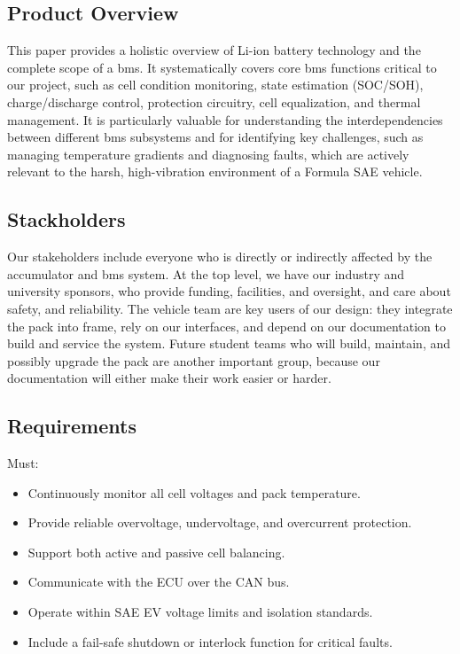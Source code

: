 \subsection{Product Overview}
This paper provides a holistic overview of Li-ion battery technology and the complete scope of a \gls{bms}. It systematically covers core \gls{bms} functions critical to our project, such as cell condition monitoring, state estimation (SOC/SOH), charge/discharge control, protection circuitry, cell equalization, and thermal management. It is particularly valuable for understanding the interdependencies between different \gls{bms} subsystems and for identifying key challenges, such as managing temperature gradients and diagnosing faults, which are actively relevant to the harsh, high-vibration environment of a Formula SAE vehicle.

\subsection{Stackholders}
Our stakeholders include everyone who is directly or indirectly affected by the accumulator and \gls{bms} system. At the top level, we have our industry and university sponsors, who provide funding, facilities, and oversight, and care about safety, and reliability. The vehicle team are key users of our design: they integrate the pack into frame, rely on our interfaces, and depend on our documentation to build and service the system. Future student teams who will build, maintain, and possibly upgrade the pack are another important group, because our documentation will either make their work easier or harder.

\subsection{Requirements}

Must:
\begin{itemize}
	\item Continuously monitor all cell voltages and pack temperature.
	\item Provide reliable overvoltage, undervoltage, and overcurrent protection.
	\item Support both active and passive cell balancing.
	\item Communicate with the ECU over the CAN bus.
	\item Operate within SAE EV voltage limits and isolation standards.
	\item Include a fail-safe shutdown or interlock function for critical faults.
\end{itemize}

